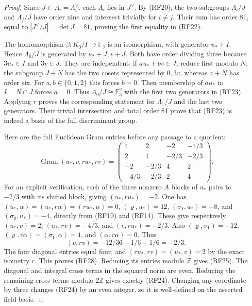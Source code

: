 \begin{proof}
Since $J\subset\Lambda_i=\Lambda_i^\vee$, each $\Lambda_i$
lies in $J^\vee$.
By (RF20), the two subgroups $\Lambda_i/J$ and $\Lambda_j/J$
have order nine and intersect trivially for $i\ne j$.
Their sum has order 81, equal to
$|J^\vee/J|=\det J=81$, proving the first equality in (RF22).

The homomorphism $\beta:K_0/I\to\mathbb F_3$ is an isomorphism,
with generator $u_*+I$. Hence $\Lambda_0/J$ is generated by
$u_*+J,v+J$.
Both have order dividing three because $3u_*\in I$ and
$3v\in J$.
They are independent: if $a u_*+b v\in J$, reduce first modulo
$N$; the subgroup $J+N$ has the two cosets represented by
$0,3v$, whereas $v+N$ has order six.
For $a,b\in\{0,1,2\}$ this forces $b=0$.
Then membership of $a u_*$ in $I=N\cap J$ forces $a=0$.
Thus $\Lambda_0/J\cong\mathbb F_3^2$ with the first two
generators in (RF23).
Applying $r$ proves the corresponding statement for
$\Lambda_1/J$ and the last two generators.
Their trivial intersection and total order 81 prove that
(RF23) is indeed a basis of the full discriminant group.

Here are the full Euclidean Gram entries before any passage
to a quotient:
\[
 \operatorname{Gram}(u_*,v,ru_*,rv)=
 \begin{pmatrix}
 4&2&-2&-4/3\\
 2&4&-2/3&-2/3\\
 -2&-2/3&4&2\\
 -4/3&-2/3&2&4
 \end{pmatrix}.
 \tag{RF28}
\]
For an explicit verification, each of the three nonzero
$A$ blocks of $u_*$ pairs to $-2/3$ with its shifted block,
giving $(u_*,ru_*)=-2$.
One has
$(u_*,\alpha)=(u_*,r\alpha)=(ru_*,\alpha)=0$,
$(\varrho,u_*)=12$,
$(\sigma_1,u_*)=-8$, and
$(\sigma_2,u_*)=-4$, directly from (RF10) and (RF14).
These give respectively
$(u_*,v)=2$, $(u_*,rv)=-4/3$, and
$(v,ru_*)=-2/3$.
Also $(\varrho,\sigma_1)=-12$,
$(\varrho,r\alpha)=(\sigma_1,\alpha)=1$,
and $(\alpha,r\alpha)=0$. Thus
\[
 (v,rv)=-12/36-1/6-1/6=-2/3.
\]
The four diagonal entries equal four, and
$(ru_*,rv)=(u_*,v)=2$ by the exact isometry $r$.
This proves (RF28).
Reducing its entries modulo $\mathbb Z$ gives (RF25).
The diagonal and integral cross terms in the squared norm
are even. Reducing the remaining cross terms modulo
$2\mathbb Z$ gives exactly (RF24).
Changing any coordinate by three changes (RF24) by an even
integer, so it is well-defined on the asserted field basis.


\end{proof}
